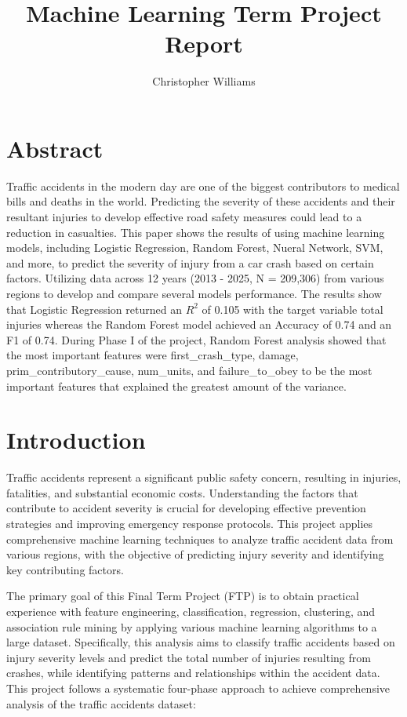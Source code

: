 \documentclass[12pt,man]{apa7}
\title{Machine Learning Term Project Report}
\author{Christopher Williams}
\affiliation{Virginia Tech}
\begin{document}
\maketitle

\tableofcontents

\listoffigures
\listoftables

\section{Abstract}

Traffic accidents in the modern day are one of the biggest contributors to medical bills and deaths in the world. Predicting 
the severity of these accidents and their resultant injuries to develop effective road safety measures could lead to a reduction in
casualties. This paper shows the results of using machine learning models, including Logistic Regression, Random Forest, Nueral Network,
SVM, and more, to predict the severity of injury from a car crash based on certain factors. Utilizing data across 12 years (2013 - 2025, N = 209,306)
from various regions to develop and compare several models performance. The results show that Logistic Regression returned an $R^2$ of 0.105 
with the target variable total injuries whereas the Random Forest model achieved an Accuracy of 0.74 and an F1 of 0.74. During Phase I of the
project, Random Forest analysis showed that the most important features were first\_crash\_type, damage, prim\_contributory\_cause, num\_units, and 
failure\_to\_obey to be the most important features that explained the greatest amount of the variance. 

\section{Introduction}

Traffic accidents represent a significant public safety concern, resulting in injuries, fatalities, and substantial economic costs. Understanding 
the factors that contribute to accident severity is crucial for developing effective prevention strategies and improving emergency response protocols.
This project applies comprehensive machine learning techniques to analyze traffic accident data from various regions, with the objective of predicting 
injury severity and identifying key contributing factors.

The primary goal of this Final Term Project (FTP) is to obtain practical experience with feature engineering, classification, regression, clustering, and 
association rule mining by applying various machine learning algorithms to a large dataset. Specifically, this analysis aims to classify traffic accidents 
based on injury severity levels and predict the total number of injuries resulting from crashes, while identifying patterns and relationships within the accident data. 
This project follows a systematic four-phase approach to achieve comprehensive analysis of the traffic accidents dataset: 
\end{document}

